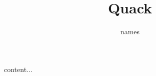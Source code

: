 \documentclass{beamer}
\author{names}
\institute{institute}
\title{Quack}
\begin{document}
\begin{frame}
content...
\end{frame}
\end{document}
